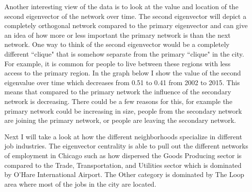 \documentclass{article}
\theoremstyle{definition}
\theoremstyle{remark}
\begin{document}
Another interesting view of the data is to look at the value and location of the second eigenvector of the network over time.  The second eigenvector will depict a completely orthogonal network compared to the primary eigenvector and can give an idea of how more or less important the primary network is than the next network.  One way to think of the second eigenvector would be a completely different ``clique" that is somehow separate from the primary ``clique" in the city.  For example, it is common for people to live between these regions with less access to the primary region.  In the graph below I show the value of the second eigenvalue over time which decreases from 0.51 to 0.41 from 2002 to 2015.  This means that compared to the primary network the influence of the secondary network is decreasing.  There could be a few reasons for this, for example the primary network could be increasing in size, people from the secondary network are joining the primary network, or people are leaving the secondary network.\\
\begin{center}
\end{center}

Next I will take a look at how the different neighborhoods specialize in different job industries.  The eigenvector centrality is able to pull out the different networks of employment in Chicago such as how dispersed the Goods Producing sector is compared to the Trade, Transportation, and Utilities sector which is dominated by O'Hare International Airport.  The Other category is dominated by The Loop area where most of the jobs in the city are located. \\
\end{document}
